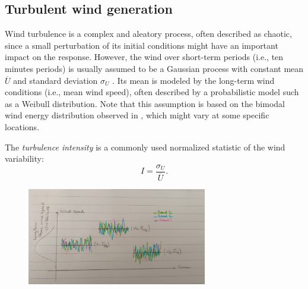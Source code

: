


\subsection{Turbulent wind generation}\label{sec:221}

Wind turbulence is a complex and aleatory process, often described as chaotic, since a small perturbation of its initial conditions might have an important impact on the response. 
However, the wind over short-term periods (i.e., ten minutes periods) is usually assumed to be a Gaussian process with constant mean $\overline{U}$ and standard deviation $\sigma_U$ \citep{burton_2021_wind_handbook}. 
Its mean is modeled by the long-term wind conditions (i.e., mean wind speed), often described by a probabilistic model such as a Weibull distribution. 
Note that this assumption is based on the bimodal wind energy distribution observed in , which might vary at some specific locations. 

The \textit{turbulence intensity} is a commonly used normalized statistic of the wind variability: 
\begin{equation}
    I = \frac{\sigma_U}{\overline{U}}.
\end{equation}

\begin{figure}
    \centering
    \includegraphics[width=0.7\textwidth]{./part1/figures/wind_long_short_term.jpg}
    \label{fig:wind_long_short_term}
    \caption{}
\end{figure}

